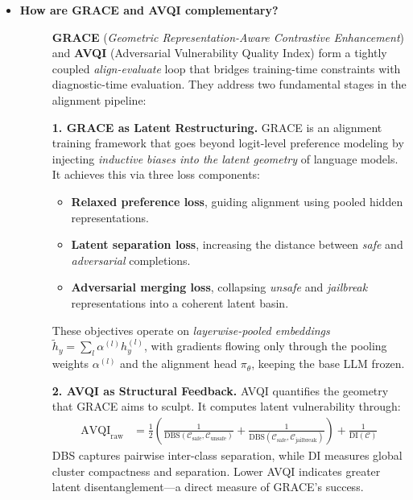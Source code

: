 \begin{itemize}[leftmargin=15pt,nolistsep]
\item[\ding{93}] { \selectfont \textbf{How are GRACE and AVQI complementary?}}
\begin{description}
\item[]
\textbf{GRACE} (\textit{Geometric Representation-Aware Contrastive Enhancement}) and \textbf{AVQI} (Adversarial Vulnerability Quality Index) form a tightly coupled \textit{align-evaluate} loop that bridges training-time constraints with diagnostic-time evaluation. They address two fundamental stages in the alignment pipeline:

\medskip
\textbf{1. GRACE as Latent Restructuring.}  
GRACE is an alignment training framework that goes beyond logit-level preference modeling by injecting \emph{inductive biases into the latent geometry} of language models. It achieves this via three loss components:
\begin{itemize}[leftmargin=1.5em, itemsep=1pt]
\item \textbf{Relaxed preference loss}, guiding alignment using pooled hidden representations.
\item \textbf{Latent separation loss}, increasing the distance between \textit{safe} and \textit{adversarial} completions.
\item \textbf{Adversarial merging loss}, collapsing \textit{unsafe} and \textit{jailbreak} representations into a coherent latent basin.
\end{itemize}
These objectives operate on \emph{layerwise-pooled embeddings} $\tilde{h}_y = \sum_l \alpha^{(l)} h_y^{(l)}$, with gradients flowing only through the pooling weights $\alpha^{(l)}$ and the alignment head $\pi_\theta$, keeping the base LLM frozen.

\medskip
\textbf{2. AVQI as Structural Feedback.}  
AVQI quantifies the geometry that GRACE aims to sculpt. It computes latent vulnerability through:
\begin{align*}
\mathrm{AVQI}_{\text{raw}} &= \frac{1}{2} \left( \frac{1}{\mathrm{DBS}(\mathcal{C}_{\text{safe}}, \mathcal{C}_{\text{unsafe}})} + \frac{1}{\mathrm{DBS}(\mathcal{C}_{\text{safe}}, \mathcal{C}_{\text{jailbreak}})} \right) + \frac{1}{\mathrm{DI}(\mathcal{C})}
\end{align*}
DBS captures pairwise inter-class separation, while DI measures global cluster compactness and separation. Lower AVQI indicates greater latent disentanglement—a direct measure of GRACE’s success.


\end{description}
\end{itemize}
